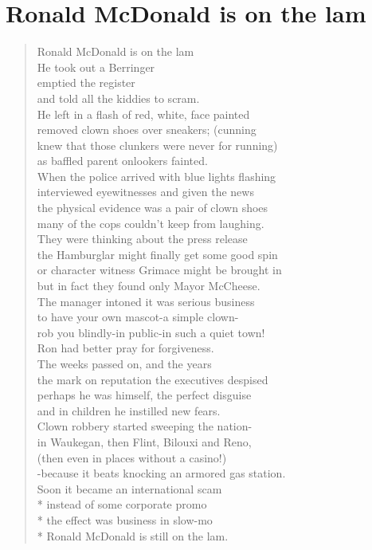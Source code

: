 \documentclass[times,12pt]{book}
\begin{document}
\section*{Ronald McDonald is on the lam}
\begin{verse}
Ronald McDonald is on the lam \\
He took out a Berringer\\
emptied the register\\
and told all the kiddies to scram.\\[8pt]

He left in a flash of red, white, face painted\\
removed clown shoes over sneakers; (cunning\\
knew that those clunkers were never for running)\\
as baffled parent onlookers fainted.\\[8pt]

When the police arrived with blue lights flashing\\
interviewed eyewitnesses and given the news\\
the physical evidence was a pair of clown shoes\\
many of the cops couldn't keep from laughing.\\[8pt]

They were thinking about the press release\\
the Hamburglar might finally get some good spin\\
or character witness Grimace might be brought in\\
but in fact they found only Mayor McCheese.\\[8pt]

The manager intoned it was serious business\\
to have your own mascot-a simple clown-\\
rob you blindly-in public-in such a quiet town!\\
Ron had better pray for forgiveness.\\[8pt]

The weeks passed on, and the years\\
the mark on reputation the executives despised\\
perhaps he was himself, the perfect disguise\\
and in children he instilled new fears.\\[8pt]

Clown robbery started sweeping the nation-\\
in Waukegan, then Flint, Bilouxi and Reno,\\
(then even in places without a casino!)\\
-because it beats knocking an armored gas station.\\[8pt]

Soon it became an international scam\\*
instead of some corporate promo\\*
the effect was business in slow-mo\\*
Ronald McDonald is still on the lam.\\[8pt]
\end{verse}
\newpage
\end{document}
